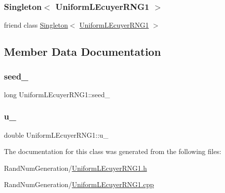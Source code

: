 \subsubsection{\texorpdfstring{Singleton$<$ Uniform\+L\+Ecuyer\+R\+N\+G1 $>$}{Singleton< UniformLEcuyerRNG1 >}}
{\footnotesize\ttfamily friend class \hyperlink{class_singleton}{Singleton}$<$ \hyperlink{class_uniform_l_ecuyer_r_n_g1}{Uniform\+L\+Ecuyer\+R\+N\+G1} $>$\hspace{0.3cm}{\ttfamily [friend]}}



\subsection{Member Data Documentation}
\hypertarget{class_uniform_l_ecuyer_r_n_g1_ab722b90ba6d65dea6874ccede2edc921}{}\label{class_uniform_l_ecuyer_r_n_g1_ab722b90ba6d65dea6874ccede2edc921} 
\subsubsection{\texorpdfstring{seed\+\_\+}{seed\_}}
{\footnotesize\ttfamily long Uniform\+L\+Ecuyer\+R\+N\+G1\+::seed\+\_\+\hspace{0.3cm}{\ttfamily [private]}}

\hypertarget{class_uniform_l_ecuyer_r_n_g1_ae14608c81e072a8f46ef2dd9b865e90c}{}\label{class_uniform_l_ecuyer_r_n_g1_ae14608c81e072a8f46ef2dd9b865e90c} 
\subsubsection{\texorpdfstring{u\+\_\+}{u\_}}
{\footnotesize\ttfamily double Uniform\+L\+Ecuyer\+R\+N\+G1\+::u\+\_\+\hspace{0.3cm}{\ttfamily [private]}}



The documentation for this class was generated from the following files\+:\begin{DoxyCompactItemize}
\item 
Rand\+Num\+Generation/\hyperlink{_uniform_l_ecuyer_r_n_g1_8h}{Uniform\+L\+Ecuyer\+R\+N\+G1.\+h}\item 
Rand\+Num\+Generation/\hyperlink{_uniform_l_ecuyer_r_n_g1_8cpp}{Uniform\+L\+Ecuyer\+R\+N\+G1.\+cpp}\end{DoxyCompactItemize}
